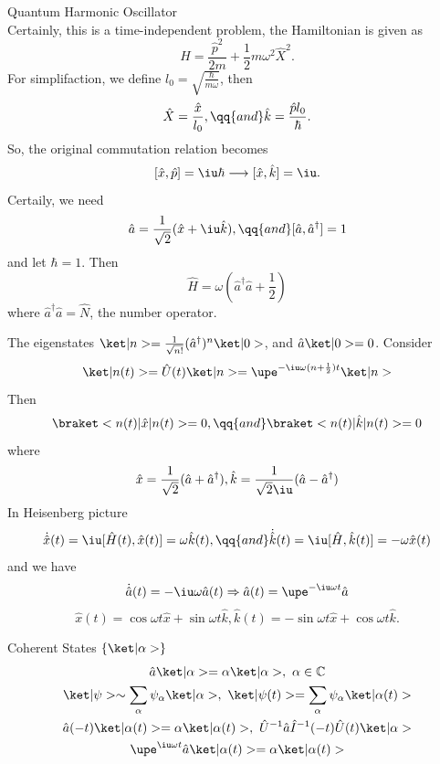 \begin{enumext}[wrap-label = \underline{Case #1}, label = \arabic*,
                list-indent = 0pt]
  \item Quantum Harmonic Oscillator\\
  Certainly, this is a time-independent problem, the Hamiltonian is given as
  \[
    \hat H = \frac{\hat p^2}{2m} + \frac12 m\omega^2 \hat X^2.
  \]
  For simplifaction, we define $l_0 = \sqrt{\frac\hbar{m\omega}}$, then
  \[
    \hat X = \frac{\hat x}{l_0}, \qq{and} \hat k = \frac{\hat p l_0}\hbar.
  \]
  So, the original commutation relation becomes
  \[
    [\hat x, \hat p] = \iu\hbar \longrightarrow [\hat x, \hat k] = \iu.
  \]
  Certaily, we need
  \[
    \hat a = \frac1{\sqrt2} (\hat x + \iu\hat k), \qq{and}
    [\hat a, \hat a^\dagger] = 1
  \]
  and let $\hbar = 1$. Then
  \[
    \hat H = \omega(\hat a^\dagger \hat a + \frac12)
  \]
  where $\hat a^\dagger \hat a = \hat N$, the number operator.
  \begin{enumext}
    \item The eigenstates
    $\ket|n> = \frac1{\sqrt{n!}} (\hat a^\dagger)^n \ket|0>$, and
    $\hat a \ket|0> = 0$.
    Consider
    \[
      \ket|n(t)> = \hat U(t) \ket|n> = \upe^{-\iu\omega(n+\frac12)t} \ket|n>
    \]
    Then
    \[
      \braket<n(t)|\hat x|n(t)> = 0, \qq{and} \braket<n(t)|\hat k|n(t)> = 0
    \]
    where
    \[
      \hat x = \frac1{\sqrt2}(\hat a + \hat a^\dagger),
      \hat k = \frac1{\sqrt2\iu} (\hat a - \hat a^\dagger)
    \]
    In Heisenberg picture
    \[
      \dot{\hat x}(t) = \iu[\hat H(t), \hat x(t)] = \omega \hat k(t), \qq{and}
      \dot{\hat k}(t) = \iu[\hat H, \hat k(t)]    = -\omega \hat x(t)
    \]
    and we have
    \[
      \dot{\hat a}(t) = -\iu\omega\hat a(t) \Rightarrow
      \hat a(t) = \upe^{-\iu\omega t} \hat a
    \]
    \[
      \hat x(t) =  \cos\omega t \hat x + \sin\omega t \hat k,
      \hat k(t) = -\sin\omega t \hat x + \cos\omega t \hat k.
    \]
    \item Coherent States $\{\ket|\alpha>\}$
    \begin{gather*}
      \hat a \ket|\alpha> = \alpha \ket|\alpha>, ~ \alpha \in \mathbb C\\
      \ket|\psi> \sim \sum_\alpha \psi_\alpha \ket|\alpha>,~ 
      \ket|\psi(t)> = \sum_\alpha \psi_\alpha \ket|\alpha(t)>\\
      \hat a(-t) \ket|\alpha(t)> = \alpha \ket|\alpha(t)>,~
      \hat U^{-1} \hat a \hat I^{-1}(-t) \hat U(t) \ket|\alpha>\\
      \upe^{\iu\omega t} \hat a\ket|\alpha(t)> = \alpha \ket|\alpha(t)>

\end{gather*}
\end{enumext}
\end{enumext}
